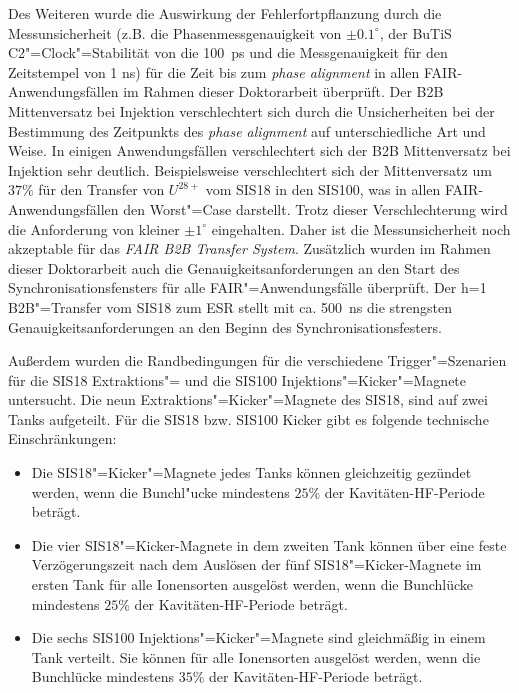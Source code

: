 Des Weiteren wurde die Auswirkung der Fehlerfortpflanzung durch die Messunsicherheit (z.B. die Phasenmessgenauigkeit von $\pm 0.1^\circ$, der BuTiS C2"=Clock"=Stabilit\"at von die \SI{100}{ps} und die Messgenauigkeit für den Zeitstempel von 1 ns) f\"ur die Zeit bis zum \textit{phase alignment} in allen FAIR-Anwendungsf\"allen im Rahmen dieser Doktorarbeit überpr\"uft. Der B2B Mittenversatz bei Injektion verschlechtert sich durch die Unsicherheiten bei der Bestimmung des Zeitpunkts des \textit{phase alignment} auf unterschiedliche Art und Weise. In einigen Anwendungsfällen verschlechtert sich der B2B Mittenversatz bei Injektion sehr deutlich. Beispielsweise verschlechtert sich der Mittenversatz um $37\%$ f\"ur den Transfer von $U^\mathit{28+}$  vom SIS18 in den SIS100, was in allen FAIR-Anwendungsf\"allen den Worst"=Case darstellt. Trotz dieser Verschlechterung wird die Anforderung von kleiner $\pm1^\circ$ eingehalten. Daher ist die Messunsicherheit noch akzeptable für das \textit{FAIR B2B Transfer System}. Zus\"atzlich wurden im Rahmen dieser Doktorarbeit auch die Genauigkeitsanforderungen an den Start des Synchronisationsfensters f\"ur alle FAIR"=Anwendungsf\"alle \"uberpr\"uft. Der h=1 B2B"=Transfer vom SIS18 zum ESR stellt mit ca. \SI{500}{\ns} die strengsten Genauigkeitsanforderungen an den Beginn des Synchronisationsfesters. 

Au\ss{}erdem wurden die Randbedingungen f\"ur die verschiedene Trigger"=Szenarien f\"ur die SIS18 Extraktions"= und die SIS100 Injektions"=Kicker"=Magnete untersucht. Die neun Extraktions"=Kicker"=Magnete des SIS18, sind auf zwei Tanks aufgeteilt. Für die SIS18 bzw. SIS100 Kicker gibt es folgende technische Einschränkungen: 
\begin{itemize}
\item Die SIS18"=Kicker"=Magnete jedes Tanks k\"onnen gleichzeitig gez\"undet werden, wenn die Bunchl"ucke mindestens $25\%$ der Kavit\"aten-HF-Periode beträgt. 
\item Die vier SIS18"=Kicker-Magnete in dem zweiten Tank k\"onnen \"uber eine feste Verz\"ogerungszeit nach dem Ausl\"osen der f\"unf SIS18"=Kicker-Magnete im ersten Tank f\"ur alle Ionensorten ausgel\"ost werden, wenn die Bunchl\"ucke mindestens $25\%$ der Kavit\"aten-HF-Periode betr\"agt. 
\item Die sechs SIS100 Injektions"=Kicker"=Magnete sind gleichm\"a\ss{}ig in einem Tank verteilt. Sie k\"onnen f\"ur alle Ionensorten ausgel\"ost werden, wenn die Bunchl\"ucke mindestens $35\%$ der Kavitäten-HF-Periode betr\"agt.  
\end{itemize}


